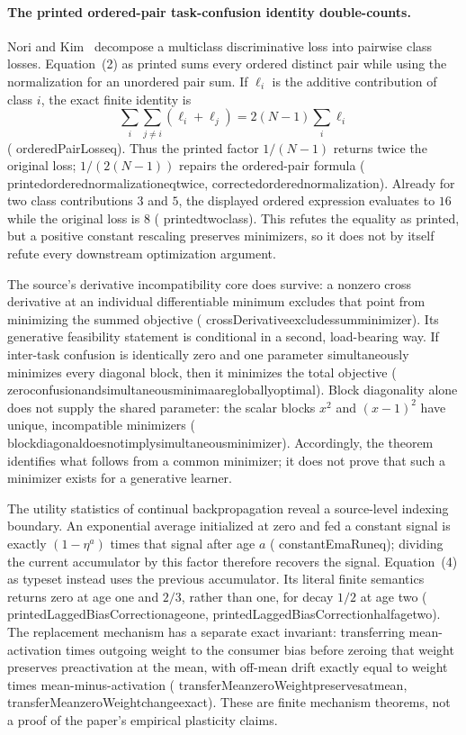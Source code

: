 \documentclass[11pt]{article}
\newcommand{\leanname}[1]{{\scriptsize\ttfamily
  \def\_{\textunderscore\allowbreak}#1}}
\begin{document}
\paragraph{The printed ordered-pair task-confusion identity double-counts.}
Nori and Kim~\cite{nori2024taskconfusion} decompose a multiclass
discriminative loss into pairwise class losses. Equation~(2) as printed sums
every ordered distinct pair while using the normalization for an unordered
pair sum. If $\ell_i$ is the additive contribution of class $i$, the exact
finite identity is
\[
 \sum_i\sum_{j\ne i}(\ell_i+\ell_j)
   =2(N-1)\sum_i\ell_i
\]
(\leanname{orderedPairLoss\_eq}). Thus the printed factor $1/(N-1)$ returns
twice the original loss; $1/(2(N-1))$ repairs the ordered-pair formula
(\leanname{printed\_ordered\_normalization\_eq\_twice},
\leanname{corrected\_ordered\_normalization}). Already for two class
contributions $3$ and $5$, the displayed ordered expression evaluates to
$16$ while the original loss is $8$
(\leanname{printed\_two\_class}). This refutes the equality as
printed, but a positive constant rescaling preserves minimizers, so it does
not by itself refute every downstream optimization argument.

The source's derivative incompatibility core does survive: a nonzero
cross derivative at an individual differentiable minimum excludes that
point from minimizing the summed objective
(\leanname{crossDerivative\_excludes\_sum\_minimizer}). Its generative
feasibility statement is conditional in a second, load-bearing way. If
inter-task confusion is identically zero and one parameter simultaneously
minimizes every diagonal block, then it minimizes the total objective
(\leanname{zero\_confusion\_and\_simultaneous\_minima\_are\_globally\_optimal}).
Block diagonality alone does not supply the shared parameter: the scalar
blocks $x^2$ and $(x-1)^2$ have unique, incompatible minimizers
(\leanname{block\_diagonal\_does\_not\_imply\_simultaneous\_minimizer}).
Accordingly, the theorem identifies what follows from a common minimizer; it
does not prove that such a minimizer exists for a generative learner.

The utility statistics of continual backpropagation
\cite{dohare2024plasticity} reveal a source-level indexing boundary.  An
exponential average initialized at zero and fed a constant signal is exactly
$(1-\eta^a)$ times that signal after age $a$
(\leanname{constantEmaRun\_eq}); dividing the current accumulator by this
factor therefore recovers the signal.  Equation~(4) as typeset instead uses
the previous accumulator.  Its literal finite semantics returns zero at age
one and $2/3$, rather than one, for decay $1/2$ at age two
(\leanname{printedLaggedBiasCorrection\_age\_one},
\leanname{printedLaggedBiasCorrection\_half\_age\_two}).  The
replacement mechanism has a separate exact invariant: transferring
mean-activation times outgoing weight to the consumer bias before zeroing
that weight preserves preactivation at the mean, with off-mean drift exactly
equal to weight times mean-minus-activation
(\leanname{transferMean\_zeroWeight\_preserves\_at\_mean},
\leanname{transferMean\_zeroWeight\_change\_exact}).  These are finite
mechanism theorems, not a proof of the paper's empirical plasticity claims.
\end{document}
